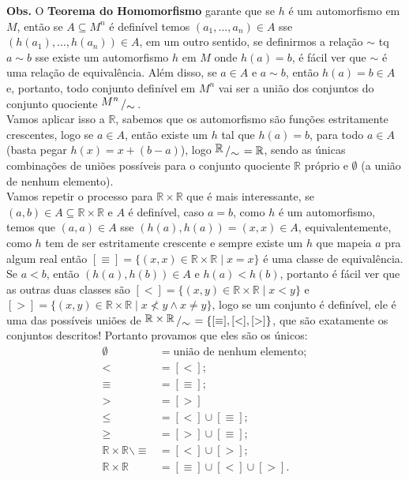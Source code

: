\documentclass[11pt]{article}
\newcommand{\mbb}[1]{\mathbb{#1}}
\newcommand{\bigslant}[2]{{\raisebox{.2em}{$#1$}\left/\raisebox{-.2em}{$#2$}\right.}}
\begin{document}
\begin{shaded}
\textbf{Obs.} O \textbf{Teorema do Homomorfismo} garante que se $h$ é um automorfismo em $M$, então se $A\subseteq M^n$ é definível temos $(a_1,\dots,a_n)\in A$ sse $(h(a_1),\dots,h(a_n))\in A$, em um outro sentido, se definirmos a relação $\sim$ tq $a\sim b$ sse existe um automorfismo $h$ em $M$ onde $h(a)=b$, é fácil ver que $\sim$ é uma relação de equivalência. Além disso, se $a\in A$ e $a\sim b$, então $h(a)=b\in A$ e, portanto, todo conjunto definível em $M^n$ vai ser a união dos conjuntos do conjunto quociente $\bigslant{M^n}{\sim}$.\\
Vamos aplicar isso a $\mbb{R}$, sabemos que os automorfismo são funções estritamente crescentes, logo se $a\in A$, então existe um $h$ tal que $h(a)=b$, para todo $a\in A$ (basta pegar $h(x)=x+(b-a)$), logo 
$\bigslant{\mbb{R}}{\sim}=\mbb{R}$, sendo as únicas combinações de uniões possíveis para o conjunto quociente $\mbb{R}$ próprio e $\emptyset$ (a união de nenhum elemento).\\
Vamos repetir o processo para $\mbb{R}\times\mbb{R}$ que é mais interessante, se $(a,b)\in A\subseteq\mbb{R}\times\mbb{R}$ e $A$ é definível, caso $a=b$, como $h$ é um automorfismo, temos que $(a,a)\in A$ sse $(h(a),h(a))=(x,x)\in A$, equivalentemente, como $h$ tem de ser estritamente crescente e sempre existe um $h$ que mapeia $a$ pra algum real então $[\equiv]=\{(x,x)\in\mbb{R}\times\mbb{R}\mid x=x\}$ é uma classe de equivalência. Se $a<b$, então $(h(a),h(b))\in A$ e $h(a)<h(b)$, portanto é fácil ver que as outras duas classes são $[<]=\{(x,y)\in\mbb{R}\times\mbb{R}\mid x<y\}$ e $[>]=\{(x,y)\in\mbb{R}\times\mbb{R}\mid x\nless y\wedge x\neq y\}$, logo se um conjunto é definível, ele é uma das possíveis uniões de $\bigslant{\mbb{R}\times\mbb{R}}{\sim}=\{[\equiv],[<],[>]\}$, que são exatamente os conjuntos descritos! Portanto provamos que eles são os únicos:
\begin{align*}
    \emptyset & = \text{união de nenhum elemento};\\
    < & = [<];\\
    \equiv & = [\equiv];\\
    > & = [>]\\
    \leq & = [<]\cup[\equiv];\\
    \geq & = [>]\cup[\equiv];\\
    \mbb{R}\times\mbb{R}\backslash\equiv & = [<]\cup[>];\\
    \mbb{R}\times\mbb{R} & = [\equiv]\cup[<]\cup[>].\\
\end{align*}
\end{shaded}
\end{document}
